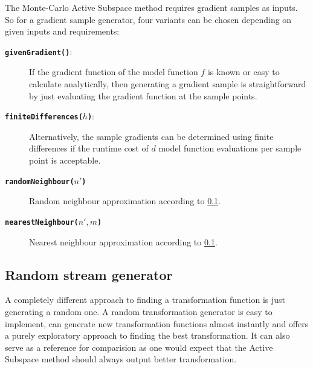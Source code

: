 \documentclass[
  a4paper,  %
  twoside,  %
  bibliography=totoc,
  headsepline,
  cleardoublepage=empty,
  parskip=half,
  draft=false
]{scrbook}
\begin{document}
The Monte-Carlo Active Subspace method requires gradient samples as inputs.
So for a gradient sample generator, four variants can be chosen depending on given inputs and requirements:
\begin{description}
\item[\texttt{\textbf{givenGradient()}}:] If the gradient function of the model function $f$ is known or easy to calculate analytically, then generating a gradient sample is straightforward by just evaluating the gradient function at the sample points.
\item[\texttt{\textbf{finiteDifferences($h$)}}:] Alternatively, the sample gradients can be determined using finite differences if the runtime cost of $d$ model function evaluations per sample point is acceptable.
\item[\texttt{\textbf{randomNeighbour($n'$)}}] Random neighbour approximation according to \ref{}.
\item[\texttt{\textbf{nearestNeighbour($n', m$)}}] Nearest neighbour approximation according to \ref{}.
\end{description}

\newpage

\subsection {Random stream generator}

A completely different approach to finding a transformation function is just generating a random one.
A random transformation generator is easy to implement, can generate new transformation functions almost instantly and offers a purely exploratory approach to finding the best transformation.
It can also serve as a reference for comparision as one would expect that the Active Subspace method should always output better transformation.
\end{document}
